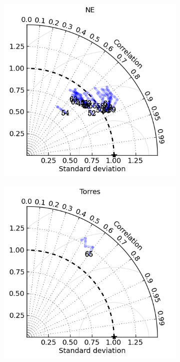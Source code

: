 \begin{figure}[!hbt]
\begin{subfigure}{0.30\textwidth}
        \caption{}
    \end{subfigure}
    \begin{subfigure}{0.30\textwidth}
        \includegraphics[width=\textwidth]{figures/plots/taylor_diag_res_NE.png}
        \caption{}
    \end{subfigure}
    \begin{subfigure}{0.30\textwidth}
        \includegraphics[width=\textwidth]{figures/plots/taylor_diag_res_Torres.png}

\end{subfigure}
\end{figure}
